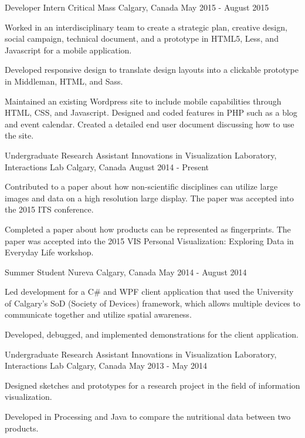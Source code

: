 \begin{cventries}
  \cventry
    {Developer Intern}
    {Critical Mass}
    {Calgary, Canada}
    {May 2015 - August 2015}
    {
      \begin{cvitems}
        \item {Worked in an interdisciplinary team to create a strategic plan, creative design, social campaign, technical document, and a prototype in HTML5, Less, and Javascript for a mobile application.}
        \item {Developed responsive design to translate design layouts into a clickable prototype in Middleman, HTML, and Sass.}
        \item {Maintained an existing Wordpress site to include mobile capabilities through HTML, CSS, and Javascript. Designed and coded features in PHP such as a blog and event calendar. Created a detailed end user document discussing how to use the site.}
      \end{cvitems}
    }
  \cventry
    {Undergraduate Research Assistant}
    {Innovations in Visualization Laboratory, Interactions Lab}
    {Calgary, Canada}
    {August 2014 - Present}
    {
      \begin{cvitems}
        \item {Contributed to a paper about how non-scientific disciplines can utilize large images and data on a high resolution large display. The paper was accepted into the 2015 ITS conference.}
        \item {Completed a paper about how products can be represented as fingerprints. The paper was accepted into the 2015 VIS Personal Visualization: Exploring Data in Everyday Life workshop.}
      \end{cvitems}
    }
  \cventry
    {Summer Student}
    {Nureva}
    {Calgary, Canada}
    {May 2014 - August 2014}
    {
      \begin{cvitems}
        \item {Led development for a C\# and WPF client application that used the University of Calgary’s SoD (Society of Devices) framework, which allows multiple devices to communicate together and utilize spatial awareness.}
        \item {Developed, debugged, and implemented demonstrations for the client application.}
      \end{cvitems}  
    }
  \cventry
    {Undergraduate Research Assistant}
    {Innovations in Visualization Laboratory, Interactions Lab}
    {Calgary, Canada}
    {May 2013 - May 2014}
    {
      \begin{cvitems}
        \item {Designed sketches and prototypes for a research project in the field of information visualization.}
        \item {Developed in Processing and Java to compare the nutritional data between two products.}
      \end{cvitems}
    }
\end{cventries}
